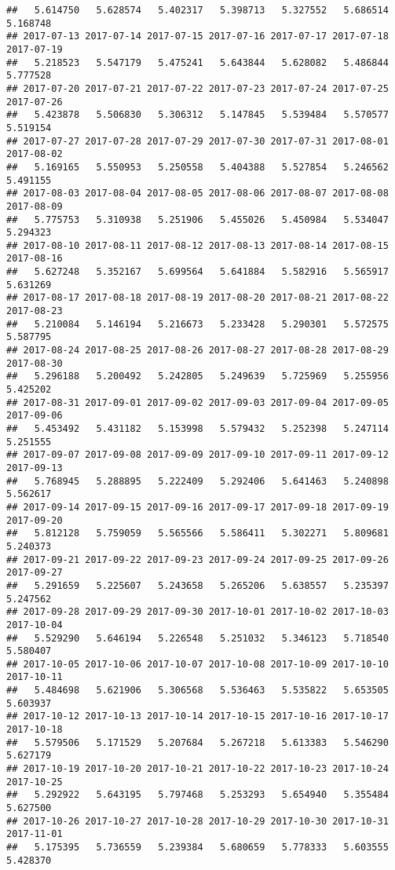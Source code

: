 \documentclass[
]{article}
\begin{document}
\begin{verbatim}
##   5.614750   5.628574   5.402317   5.398713   5.327552   5.686514   5.168748 
## 2017-07-13 2017-07-14 2017-07-15 2017-07-16 2017-07-17 2017-07-18 2017-07-19 
##   5.218523   5.547179   5.475241   5.643844   5.628082   5.486844   5.777528 
## 2017-07-20 2017-07-21 2017-07-22 2017-07-23 2017-07-24 2017-07-25 2017-07-26 
##   5.423878   5.506830   5.306312   5.147845   5.539484   5.570577   5.519154 
## 2017-07-27 2017-07-28 2017-07-29 2017-07-30 2017-07-31 2017-08-01 2017-08-02 
##   5.169165   5.550953   5.250558   5.404388   5.527854   5.246562   5.491155 
## 2017-08-03 2017-08-04 2017-08-05 2017-08-06 2017-08-07 2017-08-08 2017-08-09 
##   5.775753   5.310938   5.251906   5.455026   5.450984   5.534047   5.294323 
## 2017-08-10 2017-08-11 2017-08-12 2017-08-13 2017-08-14 2017-08-15 2017-08-16 
##   5.627248   5.352167   5.699564   5.641884   5.582916   5.565917   5.631269 
## 2017-08-17 2017-08-18 2017-08-19 2017-08-20 2017-08-21 2017-08-22 2017-08-23 
##   5.210084   5.146194   5.216673   5.233428   5.290301   5.572575   5.587795 
## 2017-08-24 2017-08-25 2017-08-26 2017-08-27 2017-08-28 2017-08-29 2017-08-30 
##   5.296188   5.200492   5.242805   5.249639   5.725969   5.255956   5.425202 
## 2017-08-31 2017-09-01 2017-09-02 2017-09-03 2017-09-04 2017-09-05 2017-09-06 
##   5.453492   5.431182   5.153998   5.579432   5.252398   5.247114   5.251555 
## 2017-09-07 2017-09-08 2017-09-09 2017-09-10 2017-09-11 2017-09-12 2017-09-13 
##   5.768945   5.288895   5.222409   5.292406   5.641463   5.240898   5.562617 
## 2017-09-14 2017-09-15 2017-09-16 2017-09-17 2017-09-18 2017-09-19 2017-09-20 
##   5.812128   5.759059   5.565566   5.586411   5.302271   5.809681   5.240373 
## 2017-09-21 2017-09-22 2017-09-23 2017-09-24 2017-09-25 2017-09-26 2017-09-27 
##   5.291659   5.225607   5.243658   5.265206   5.638557   5.235397   5.247562 
## 2017-09-28 2017-09-29 2017-09-30 2017-10-01 2017-10-02 2017-10-03 2017-10-04 
##   5.529290   5.646194   5.226548   5.251032   5.346123   5.718540   5.580407 
## 2017-10-05 2017-10-06 2017-10-07 2017-10-08 2017-10-09 2017-10-10 2017-10-11 
##   5.484698   5.621906   5.306568   5.536463   5.535822   5.653505   5.603937 
## 2017-10-12 2017-10-13 2017-10-14 2017-10-15 2017-10-16 2017-10-17 2017-10-18 
##   5.579506   5.171529   5.207684   5.267218   5.613383   5.546290   5.627179 
## 2017-10-19 2017-10-20 2017-10-21 2017-10-22 2017-10-23 2017-10-24 2017-10-25 
##   5.292922   5.643195   5.797468   5.253293   5.654940   5.355484   5.627500 
## 2017-10-26 2017-10-27 2017-10-28 2017-10-29 2017-10-30 2017-10-31 2017-11-01 
##   5.175395   5.736559   5.239384   5.680659   5.778333   5.603555   5.428370 

\end{verbatim}
\end{document}
